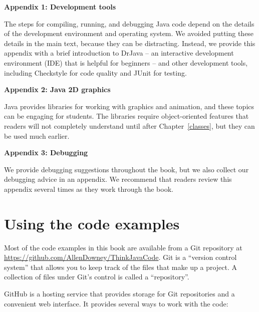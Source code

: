 \documentclass[12pt]{book}
\theoremstyle{exercise}
\begin{document}
\begin{description}

\item{\bf Appendix 1: Development tools}

The steps for compiling, running, and debugging Java code depend on the details of the development environment and operating system.
We avoided putting these details in the main text, because they can be distracting.
Instead, we provide this appendix with a brief introduction to DrJava -- an interactive development environment (IDE) that is helpful for beginners -- and other development tools, including Checkstyle for code quality and JUnit for testing.

\item{\bf Appendix 2: Java 2D graphics}

Java provides libraries for working with graphics and animation, and these topics can be engaging for students.
The libraries require object-oriented features that readers will not completely understand until after Chapter~\ref{classes}, but they can be used much earlier.

\item{\bf Appendix 3: Debugging}

We provide debugging suggestions throughout the book, but we also collect our debugging advice in an appendix.
We recommend that readers review this appendix several times as they work through the book.

\end{description}


\section*{Using the code examples}
\label{code}

Most of the code examples in this book are available from a Git repository at \url{https://github.com/AllenDowney/ThinkJavaCode}.
Git is a ``version control system'' that allows you to keep track of the files that make up a project.
A collection of files under Git's control is called a ``repository''.


GitHub is a hosting service that provides storage for Git repositories and a convenient web interface.
It provides several ways to work with the code:
\end{document}
